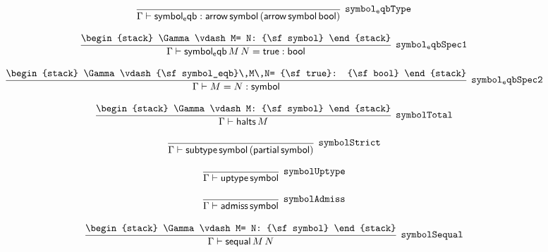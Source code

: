 \[
\infer[{\tt symbol_eqbType}]{\Gamma \vdash {\sf symbol_eqb}: {\sf arrow}\,{\sf symbol}\,({\sf arrow}\,{\sf symbol}\,{\sf bool})}{}
\]

\[
\infer[{\tt symbol_eqbSpec1}]{\Gamma \vdash {\sf symbol_eqb}\,M\,N= {\sf true}: {\sf bool}}{
\begin{stack}
\Gamma \vdash M= N: {\sf symbol}
\end{stack}}
\]

\[
\infer[{\tt symbol_eqbSpec2}]{\Gamma \vdash M= N: {\sf symbol}}{
\begin{stack}
\Gamma \vdash {\sf symbol_eqb}\,M\,N= {\sf true}: {\sf bool}
\end{stack}}
\]

\[
\infer[{\tt symbolTotal}]{\Gamma \vdash {\sf halts}\,M}{
\begin{stack}
\Gamma \vdash M: {\sf symbol}
\end{stack}}
\]

\[
\infer[{\tt symbolStrict}]{\Gamma \vdash {\sf subtype}\,{\sf symbol}\,({\sf partial}\,{\sf symbol})}{}
\]

\[
\infer[{\tt symbolUptype}]{\Gamma \vdash {\sf uptype}\,{\sf symbol}}{}
\]

\[
\infer[{\tt symbolAdmiss}]{\Gamma \vdash {\sf admiss}\,{\sf symbol}}{}
\]

\[
\infer[{\tt symbolSequal}]{\Gamma \vdash {\sf sequal}\,M\,N}{
\begin{stack}
\Gamma \vdash M= N: {\sf symbol}
\end{stack}}
\]

